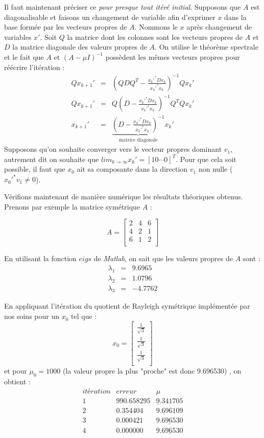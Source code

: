 Il faut maintenant préciser ce \textit{pour presque tout itéré initial}. Supposons que $A$ est diagonalisable et faisons un changement de variable afin d'exprimer $x$ dans la base formée par les vecteurs propres de $A$. Nommons le $x$ après changement de variables $x'$. Soit $Q$ la matrice dont les colonnes sont les vecteurs propres de $A$ et $D$ la matrice diagonale des valeurs propres de $A$. On utilise le théorème spectrale et le fait que $A$ et $(A-\mu I)^{-1}$ possèdent les mêmes vecteurs propres pour réécrire l'itération : 
\begin{eqnarray}
Qx_{k+1}' & = &(Q D Q^T - \frac{x_k'^* D x_k}{x_k'^* x_k})^{-1} Qx_{k}'\\
Qx_{k+1}' & = & Q(D-\frac{x_k'^* D x_k}{x_k'^* x_k})^{-1}Q^T Qx_k'\\
x_{k+1}' & = & \underbrace{(D-\frac{x_k'^* D x_k}{x_k'^* x_k})^{-1}}_{\text{matrice diagonale}} x_k'
\end{eqnarray}
Supposons qu'on souhaite converger vers le vecteur propres dominant $v_1$, autrement dit on souhaite que $lim_{k\rightarrow \infty} x_k' = [1 0 \cdots 0]^T$. Pour que cela soit possible, il faut que $x_0$ ait sa composante dans la direction $v_1$ non nulle ($x_0'^* v_1 \neq 0$). 

Vérifions maintenant de manière numérique les résultats théoriques obtenus. Prenons par exemple la matrice symétrique $A$ : 

$$ A = \left[
\begin{array}{ccc}
  2 & 4 & 6  \\
  4 & 2 & 1 \\
  6 & 1 & 2 \\
\end{array}
\right]$$

En utilisant la fonction $eigs$ de \textit{Matlab}, on sait que les valeurs propres de $A$ sont : 
   \begin{eqnarray*}
   \lambda_1 &=& 9.6965\\
   \lambda_2 &=& 1.0796 \\
   \lambda_3 &=& -4.7762
   \end{eqnarray*}

En appliquant l'itération du quotient de Rayleigh symétrique implémentée par nos soins pour un $x_0$ tel que : 
$$ x_0 = \left[
\begin{array}{c}
  \frac{1}{\sqrt{3}}  \\
  \frac{1}{\sqrt{3}} \\
  \frac{1}{\sqrt{3}} \\
\end{array}
\right]$$
 et pour $\mu_0 = 1000$ (la valeur propre la plus "proche" est donc 9.696530) , on obtient : 
$$\begin{array}{ccc}
  itération & erreur & \mu  \\
  1 &  990.658295   & \underline{9}.341705  \\
  2 &   0.354404   &  \underline{9.696}109\\
  3 &  0.000421  & \underline{9.696530} \\
  4 &  0.000000  & \underline{9.696530} \\
\end{array}$$


